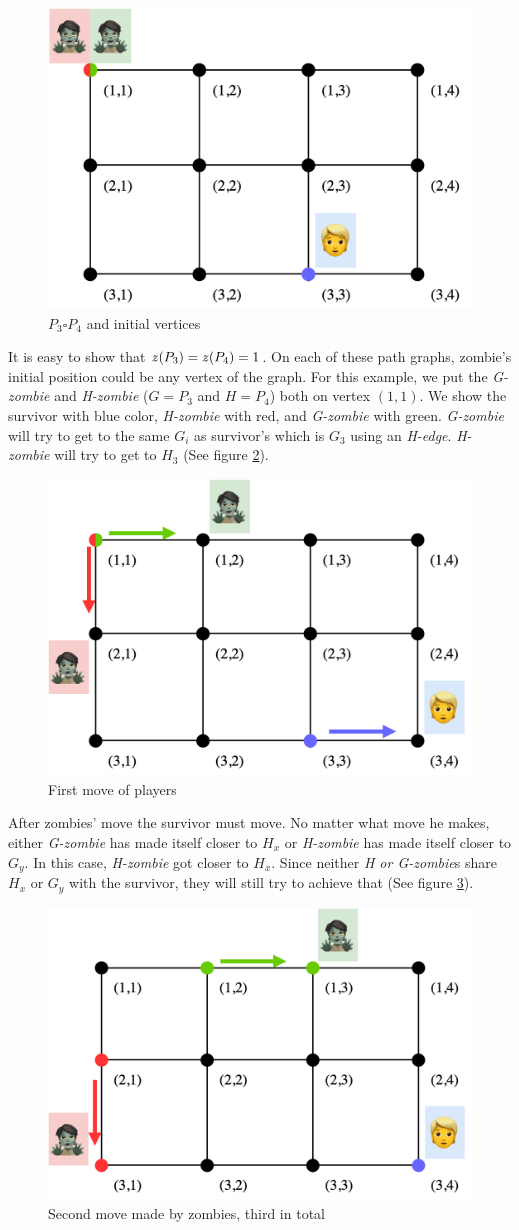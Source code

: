 \documentclass[1p]{elsarticle}
\newcommand{\zn}{\ooalign{$z$\cr\hfil\rule[.5ex]{.2em}{.08ex}\hfil\cr}}
\begin{document}
\begin{figure}[h!]
	\centering
	\includegraphics[width=0.5\linewidth]{fig/p34m1.png}
	\caption{$P_3 \square P_4$ and initial vertices}
	\label{fig:p3}
\end{figure}

It is easy to show that $\zn(P_3) = \zn(P_4) = 1$. On each of these path graphs, zombie's initial position could be any
vertex of the graph. For this example, we put the {\it G-zombie} and {\it H-zombie} ($G = P_3$ and $H = P_4$) both on
vertex $(1,1)$. We show the survivor with blue color, {\it H-zombie} with red, and {\it G-zombie} with green. {\it
G-zombie} will try to get to the same $G_{i}$ as survivor's which is $G_3$ using an {\it H-edge}. {\it H-zombie} will
try to get to $H_3$ (See figure \ref{fig:p4}).

\begin{figure}[h!]
	\centering
	\includegraphics[width=0.5\linewidth]{fig/p34m2.png}
	\caption{First move of players}
	\label{fig:p4}
\end{figure}

After zombies' move the survivor must move. No matter what move he makes, either {\it G-zombie} has made itself closer
to $H_x$ or {\it H-zombie} has made itself closer to $G_y$. In this case, {\it H-zombie} got closer to $H_x$. Since
neither {\it H or G-zombie}s share $H_x$ or $G_y$ with the survivor, they will still try to achieve that (See figure \ref{fig:p5}).

\begin{figure}[h!]
	\centering
	\includegraphics[width=0.5\linewidth]{fig/p34m3.png}
	\caption{Second move made by zombies, third in total}
	\label{fig:p5}
\end{figure}
\end{document}
